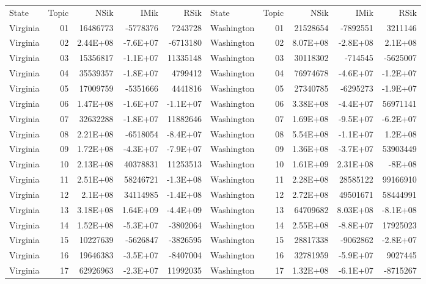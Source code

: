 \begin{table}[]
	\footnotesize
	\begin{tabular}{lrrrrlrrrr}
		State & Topic & NSik & IMik & RSik & State & Topic & NSik & IMik & RSik \\
		Virginia &  01  & 16486773 & -5778376 & 7243728 & Washington &  01  & 21528654 & -7892551 & 3211146 \\
		Virginia &  02  & 2.44E+08 & -7.6E+07 & -6713180 & Washington &  02  & 8.07E+08 & -2.8E+08 & 2.1E+08 \\
		Virginia &  03  & 15356817 & -1.1E+07 & 11335148 & Washington &  03  & 30118302 & -714545 & -5625007 \\
		Virginia &  04  & 35539357 & -1.8E+07 & 4799412 & Washington &  04  & 76974678 & -4.6E+07 & -1.2E+07 \\
		Virginia &  05  & 17009759 & -5351666 & 4441816 & Washington &  05  & 27340785 & -6295273 & -1.9E+07 \\
		Virginia &  06  & 1.47E+08 & -1.6E+07 & -1.1E+07 & Washington &  06  & 3.38E+08 & -4.4E+07 & 56971141 \\
		Virginia &  07  & 32632288 & -1.8E+07 & 11882646 & Washington &  07  & 1.69E+08 & -9.5E+07 & -6.2E+07 \\
		Virginia &  08  & 2.21E+08 & -6518054 & -8.4E+07 & Washington &  08  & 5.54E+08 & -1.1E+07 & 1.2E+08 \\
		Virginia &  09  & 1.72E+08 & -4.3E+07 & -7.9E+07 & Washington &  09  & 1.36E+08 & -3.7E+07 & 53903449 \\
		Virginia &  10 & 2.13E+08 & 40378831 & 11253513 & Washington &  10 & 1.61E+09 & 2.31E+08 & -8E+08 \\
		Virginia &  11 & 2.51E+08 & 58246721 & -1.3E+08 & Washington &  11 & 2.28E+08 & 28585122 & 99166910 \\
		Virginia &  12 & 2.1E+08 & 34114985 & -1.4E+08 & Washington &  12 & 2.72E+08 & 49501671 & 58444991 \\
		Virginia &  13 & 3.18E+08 & 1.64E+09 & -4.4E+09 & Washington &  13 & 64709682 & 8.03E+08 & -8.1E+08 \\
		Virginia &  14 & 1.52E+08 & -5.3E+07 & -3802064 & Washington &  14 & 2.55E+08 & -8.8E+07 & 17925023 \\
		Virginia &  15 & 10227639 & -5626847 & -3826595 & Washington &  15 & 28817338 & -9062862 & -2.8E+07 \\
		Virginia &  16 & 19646383 & -3.5E+07 & -8407004 & Washington &  16 & 32781959 & -5.9E+07 & 9027445 \\
		Virginia &  17 & 62926963 & -2.3E+07 & 11992035 & Washington &  17 & 1.32E+08 & -6.1E+07 & -8715267 \\

\end{tabular}
\end{table}
